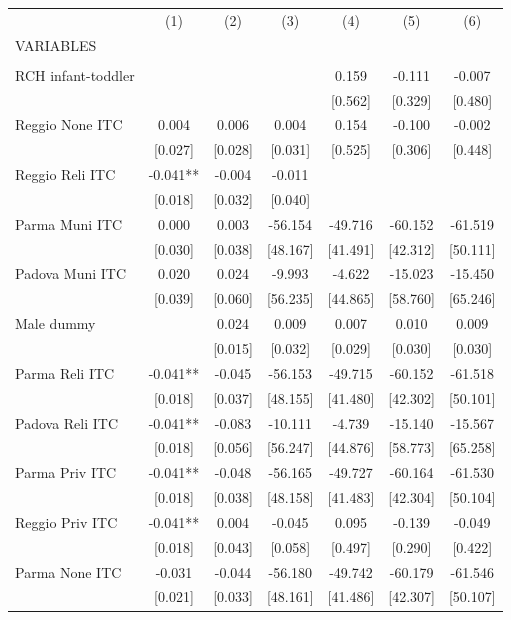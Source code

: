\begin{tabular}{lcccccc} \hline
 & (1) & (2) & (3) & (4) & (5) & (6) \\
VARIABLES &  &  &  &  &  &  \\ \hline
 &  &  &  &  &  &  \\
RCH infant-toddler &  &  &  & 0.159 & -0.111 & -0.007 \\
 &  &  &  & [0.562] & [0.329] & [0.480] \\
Reggio None ITC & 0.004 & 0.006 & 0.004 & 0.154 & -0.100 & -0.002 \\
 & [0.027] & [0.028] & [0.031] & [0.525] & [0.306] & [0.448] \\
Reggio Reli ITC & -0.041** & -0.004 & -0.011 &  &  &  \\
 & [0.018] & [0.032] & [0.040] &  &  &  \\
Parma Muni ITC & 0.000 & 0.003 & -56.154 & -49.716 & -60.152 & -61.519 \\
 & [0.030] & [0.038] & [48.167] & [41.491] & [42.312] & [50.111] \\
Padova Muni ITC & 0.020 & 0.024 & -9.993 & -4.622 & -15.023 & -15.450 \\
 & [0.039] & [0.060] & [56.235] & [44.865] & [58.760] & [65.246] \\
Male dummy &  & 0.024 & 0.009 & 0.007 & 0.010 & 0.009 \\
 &  & [0.015] & [0.032] & [0.029] & [0.030] & [0.030] \\
Parma Reli ITC & -0.041** & -0.045 & -56.153 & -49.715 & -60.152 & -61.518 \\
 & [0.018] & [0.037] & [48.155] & [41.480] & [42.302] & [50.101] \\
Padova Reli ITC & -0.041** & -0.083 & -10.111 & -4.739 & -15.140 & -15.567 \\
 & [0.018] & [0.056] & [56.247] & [44.876] & [58.773] & [65.258] \\
Parma Priv ITC & -0.041** & -0.048 & -56.165 & -49.727 & -60.164 & -61.530 \\
 & [0.018] & [0.038] & [48.158] & [41.483] & [42.304] & [50.104] \\
Reggio Priv ITC & -0.041** & 0.004 & -0.045 & 0.095 & -0.139 & -0.049 \\
 & [0.018] & [0.043] & [0.058] & [0.497] & [0.290] & [0.422] \\
Parma None ITC & -0.031 & -0.044 & -56.180 & -49.742 & -60.179 & -61.546 \\
 & [0.021] & [0.033] & [48.161] & [41.486] & [42.307] & [50.107] \\

\end{tabular}
